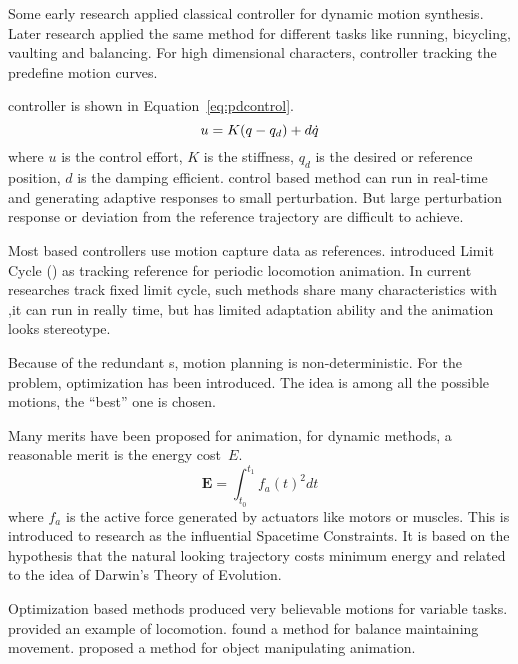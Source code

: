 \begin{itemize}




Some early research applied classical \pd controller \citep{Raibert1991} for dynamic motion synthesis.
Later research \citep{Hodgins1995} applied the same method for different tasks like running, bicycling, vaulting and balancing. 
For high dimensional characters, \pd controller tracking the predefine motion curves\citep{Yin2007}.

\pd controller is shown in Equation~\ref{eq:pdcontrol}.
\begin{equation}
\label{eq:pdcontrol}
u=K(q -q_d)+d\dot{q}
\end{equation}
where $u$ is the control effort, $K$ is the stiffness, $q_d$ is the desired or reference position, $d$ is the damping efficient.
\pd control based method can run in real-time and generating adaptive responses to small perturbation.
But large perturbation response or deviation from the reference trajectory are difficult to achieve.


Most \pd based controllers use motion capture data as references.
\citet{Laszlo1996} introduced Limit Cycle (\lc) as tracking reference for periodic locomotion animation. 
In current researches\citep{Coros2009,coros2010generalized,Laszlo1996} track fixed limit cycle,
such methods share many characteristics with \pd,it can run in really time, but has limited adaptation ability and the animation looks stereotype.







Because of the redundant \dof s, motion planning is non-deterministic.
For the problem, optimization has been introduced.
The idea is among all the possible motions, the ``best'' one is chosen.

Many merits have been proposed for animation, 
for dynamic methods, a reasonable merit is the energy cost~$E$. 
\begin{equation}
 \textbf{E}=\int_{t_0}^{t_1}f_{a}(t)^2dt
\end{equation}
where $f_{a}$ is the active force generated by actuators like motors or muscles. 
This is introduced to \cms research as the influential Spacetime Constraints\citep{Witkin1988}. 
It is based on the hypothesis that the natural looking trajectory costs minimum energy 
and related to the idea of Darwin's Theory of Evolution. 

Optimization based  methods produced very believable motions for variable tasks. 
\citet{Jain2009} provided an example of locomotion.  
\citet{BalanceControl} found a method for balance maintaining movement. 
\citet{Liu2009} proposed a method for object manipulating animation. 
\end{itemize}


